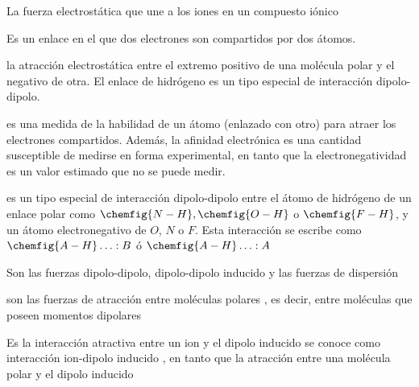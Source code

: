 \begin{definition}
	La fuerza electrostática que une a los iones en un compuesto iónico
\end{definition}

\begin{definition}
	Es un enlace en el que dos electrones son compartidos por dos átomos.
\end{definition}

\begin{definition}[Dipolo]
	la atracción electrostática entre el extremo positivo de una molécula polar y el negativo de otra. El enlace de hidrógeno es un tipo especial de interacción dipolo-dipolo.
\end{definition}

\begin{definition}[Electronegatividad]
	es una medida de la habilidad de
	un átomo (enlazado con otro) para atraer los electrones compartidos. Además, la afinidad
	electrónica es una cantidad susceptible de medirse en forma experimental, en tanto que la
	electronegatividad es un valor estimado que no se puede medir.
\end{definition}

\begin{definition}
	es un tipo especial de interacción dipolo-dipolo entre el átomo de hidrógeno de un enlace polar
	como $\chemfig{N-H}, \chemfig{O-H}$ o $\chemfig{F-H}$, y un átomo electronegativo de $O$, $N$ o $F$. Esta interacción se escribe como
	$\chemfig{A - H} \ldots : B$ ó $\chemfig{A - H} \ldots : A$
\end{definition}

\begin{definition}
	Son las fuerzas dipolo-dipolo, dipolo-dipolo inducido y las fuerzas de dispersión
\end{definition}

\begin{definition}
	son las fuerzas de atracción entre moléculas polares , es decir,
	entre moléculas que poseen momentos dipolares
\end{definition}

\begin{definition}
	Es la interacción atractiva entre un ion y el dipolo
	inducido se conoce como interacción ion-dipolo inducido , en tanto que la atracción entre
	una molécula polar y el dipolo inducido
\end{definition}

